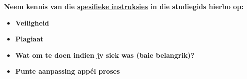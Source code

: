    \noindent
    \textbf{Neem kennis van die \uline{spesifieke instruksies} in die
      studiegids hierbo op:}
    \begin{itemize}
        \item \textbf{Veiligheid}
        \item \textbf{Plagiaat}
        \item \textbf{Wat om te doen indien jy siek was (baie belangrik)?}
        \item \textbf{Punte aanpassing app\'el proses}
    \end{itemize}


    